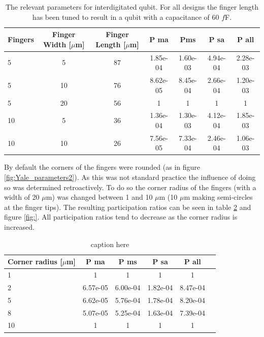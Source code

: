\begin{table}
	\begin{center}
		\begin{tabular}{ | l || c | c || c | c | c | c |}
			\hline
			Fingers  & Finger Width [\(\mu\)m] & Finger Length [\(\mu\)m]  & P ma &  Pms & P sa & P all \\ \hline
			5 & 5 & 87 & 1.85e-04 & 1.60e-03 & 4.94e-04 & 2.28e-03 \\  
			5 & 10 & 76 & 8.62e-05 & 8.45e-04 & 2.66e-04 & 1.20e-03 \\
			5 & 20 & 56 & 1 & 1 &1  & 1 \\
			10 & 5 & 36 & 1.36e-04 & 1.30e-03 & 4.12e-04 & 1.85e-03 \\
			10 & 10 & 26 & 7.56e-05 & 7.33e-04 & 2.46e-04 & 1.06e-03 \\
			\hline
		\end{tabular}
	\end{center}
	\caption{The relevant parameters for interdigitated qubit. For all designs the finger length has been tuned to result in a qubit with a capacitance of 60 \(f\)F. }
	\label{table:60fF_fingerlength}
\end{table}



By default the corners of the fingers were rounded (as in figure \ref{fig:Yale_parameters2}). As this was not standard practice the influence of doing so was determined retroactively. To do so the corner radius of the fingers (with a width of 20 \(\mu\)m) was changed between 1 and 10 \(\mu\)m (10 \(\mu\)m making semi-circles at the finger tips). The resulting participation ratios can be seen in table \ref{table:ratio_cornerradius} and figure \ref{fig:}. All participation ratios tend to decrease as the corner radius is increased. 

\begin{table}
	\begin{center}
		\begin{tabular}{ | l || c | c | c | c | c |}
			\hline
			Corner radius [\(\mu\)m] & P ma & P ms & P sa & P all \\ \hline
			1 & 1 & 1 & 1 & 1 \\
			2 & 6.57e-05 & 6.00e-04 & 1.82e-04 & 8.47e-04 \\
			5 & 6.62e-05 & 5.76e-04 & 1.78e-04 & 8.20e-04\\
			8 & 5.07e-05 & 5.25e-04 & 1.63e-04 & 7.39e-04\\
			10 & 1 & 1 & 1 & 1\\
			\hline
		\end{tabular}
	\end{center}
	\caption{caption here}
	\label{table:ratio_cornerradius}
\end{table}

